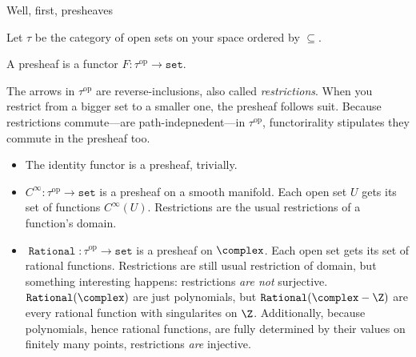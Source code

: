 \documentclass[a5paper]{scrartcl}
\def\setcat{\texttt{set}}
\newcommand{\op}{\textrm{op}}
\newcommand{\marginnote}[1]{\normalmarginpar\marginpar{\tiny\sffamily\raggedright #1}}
\DeclareMathOperator{\rat}{\texttt{Rational}}
\begin{document}
Well, first, presheaves
\begin{defn}\marginnote{\ie, draw one arrow \(A\to B\) iff \(A\subseteq B\).}
  Let \(\tau\) be the category of open sets on your space ordered by \(\subseteq\).
\end{defn}
\begin{defn}[Presheaves]
  A presheaf is a functor \(F: \tau^\op\to \setcat\).
\end{defn}
The arrows in \(\tau^\op\) are reverse-inclusions, also called \emph{restrictions}. When you restrict from a bigger set to a smaller one, the presheaf follows suit.  Because restrictions commute---are path-indepnedent---in \(\tau^\op\), functorirality stipulates they commute in the presheaf too.
\begin{itemize}
  \item The identity functor is a presheaf, trivially.
  \item \(C^\infty:\tau^\op \to \setcat\) is a presheaf on a smooth manifold. Each open set \(U\) gets its set of functions \(C^\infty(U)\). Restrictions are the usual restrictions of a function's domain.

  \item \(\rat: \tau^\op \to \setcat\) is a presheaf on \(\complex\). Each open set gets its set of rational functions. Restrictions are still usual restriction of domain, but something interesting happens: restrictions \emph{are not} surjective. \(\rat(\complex)\) are just polynomials, but \(\rat(\complex - \Z)\) are every rational function with singularites on \(\Z\). Additionally, because polynomials, hence rational functions, are fully determined by their values on finitely many points, restrictions \emph{are} injective.
\end{itemize}
\end{document}
